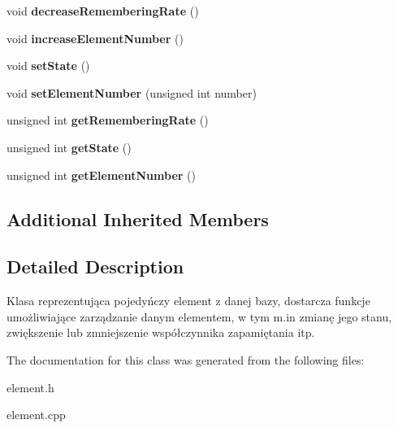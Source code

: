 \begin{DoxyCompactItemize}
void {\bfseries decrease\+Remembering\+Rate} ()
\item 
\mbox{\label{class_element_a02a96acb593527ad29e3eeade4b0db3c}} 
void {\bfseries increase\+Element\+Number} ()
\item 
\mbox{\label{class_element_a37a5f4e146bd163265ac635221db0989}} 
void {\bfseries set\+State} ()
\item 
\mbox{\label{class_element_a5b9df05146831f5a2ebb4ec2217e4b58}} 
void {\bfseries set\+Element\+Number} (unsigned int number)
\item 
\mbox{\label{class_element_aa2c0c0905c4b35e907370e7dcb17d58a}} 
unsigned int {\bfseries get\+Remembering\+Rate} ()
\item 
\mbox{\label{class_element_ac75b3627ff0489f08ffd97c6c2c190bd}} 
unsigned int {\bfseries get\+State} ()
\item 
\mbox{\label{class_element_afb522900996a2af26c6a5924934532c3}} 
unsigned int {\bfseries get\+Element\+Number} ()
\end{DoxyCompactItemize}
\subsection*{Additional Inherited Members}


\subsection{Detailed Description}
Klasa reprezentująca pojedyńczy element z danej bazy, dostarcza funkcje umożliwiające zarządzanie danym elementem, w tym m.\+in zmianę jego stanu, zwiększenie lub zmniejszenie współczynnika zapamiętania itp. 

The documentation for this class was generated from the following files\+:\begin{DoxyCompactItemize}
\item 
element.\+h\item 
element.\+cpp\end{DoxyCompactItemize}
